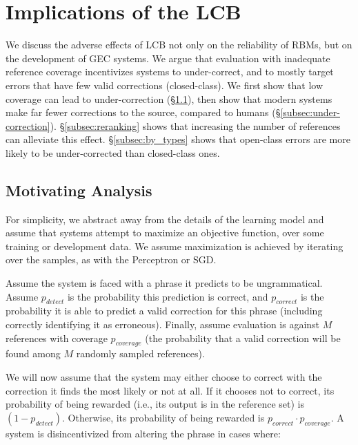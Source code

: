\documentclass[11pt, a4paper]{article}
\begin{document}
\section{Implications of the LCB}\label{sec:formal_conservatism}

We discuss the adverse effects of LCB not only on the reliability of RBMs, but on the development
of GEC systems.
We argue that evaluation with inadequate reference coverage incentivizes systems to under-correct,
and to mostly target errors that have few valid corrections (closed-class).
We first show that low coverage can lead to under-correction (\S\ref{subsec:motivating_analysis}),
then show that modern systems make far fewer corrections to the source, compared to humans (\S\ref{subsec:under-correction}).
\S\ref{subsec:reranking} shows that increasing the number of references can alleviate this effect.
\S\ref{subsec:by_types} shows that open-class errors are more likely to be under-corrected than closed-class ones.

\subsection{Motivating Analysis}\label{subsec:motivating_analysis}

For simplicity, we abstract away from the details of the learning model and assume 
that systems attempt to maximize an objective function, 
over some training or development data. 
We assume maximization is achieved by iterating over the samples, as with the Perceptron or SGD.

Assume the system is faced with a phrase it predicts to be ungrammatical. 
Assume $p_{detect}$ is the probability this prediction is correct, and
$p_{correct}$ is the probability it is able to predict
a valid correction for this phrase (including correctly identifying it as erroneous).
Finally, assume evaluation is
against $M$ references with coverage $p_{coverage}$
(the probability that
a valid correction will be found among $M$ randomly sampled references).

We will now assume that the system may either choose to correct with the correction it finds 
the most likely or not at all. If it chooses not to correct, its probability of being rewarded 
(i.e., its output is in the reference set) is $(1-p_{detect})$. Otherwise, its probability
of being rewarded is $p_{correct} \cdot p_{coverage}$.
A system is disincentivized from altering the phrase in cases where:
\end{document}
